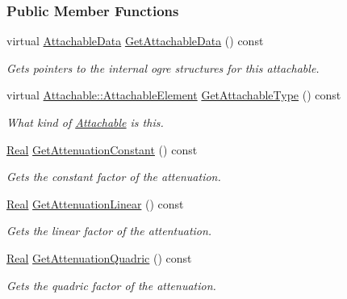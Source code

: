 \subsubsection*{Public Member Functions}
\begin{DoxyCompactItemize}
\item 
virtual \hyperlink{structMezzanine_1_1AttachableData}{AttachableData} \hyperlink{classMezzanine_1_1Light_aefbd732fe2b4a5b00cdb9d30dce2c5ce}{GetAttachableData} () const 
\begin{DoxyCompactList}\small\item\em Gets pointers to the internal ogre structures for this attachable. \item\end{DoxyCompactList}\item 
virtual \hyperlink{classMezzanine_1_1Attachable_a274bd45f9666f6e50f6fdd8a0162bc9e}{Attachable::AttachableElement} \hyperlink{classMezzanine_1_1Light_a530d776b916f3d8164dc2b8583040f64}{GetAttachableType} () const 
\begin{DoxyCompactList}\small\item\em What kind of \hyperlink{classMezzanine_1_1Attachable}{Attachable} is this. \item\end{DoxyCompactList}\item 
\hyperlink{namespaceMezzanine_a726731b1a7df72bf3583e4a97282c6f6}{Real} \hyperlink{classMezzanine_1_1Light_a9564b933f74967b89b144650abe75a48}{GetAttenuationConstant} () const 
\begin{DoxyCompactList}\small\item\em Gets the constant factor of the attenuation. \item\end{DoxyCompactList}\item 
\hyperlink{namespaceMezzanine_a726731b1a7df72bf3583e4a97282c6f6}{Real} \hyperlink{classMezzanine_1_1Light_aeb3f9b4ce95a43fe9253dc455e83f45e}{GetAttenuationLinear} () const 
\begin{DoxyCompactList}\small\item\em Gets the linear factor of the attentuation. \item\end{DoxyCompactList}\item 
\hyperlink{namespaceMezzanine_a726731b1a7df72bf3583e4a97282c6f6}{Real} \hyperlink{classMezzanine_1_1Light_a89f2ed0a02bf28bacad1569877e35a78}{GetAttenuationQuadric} () const 
\begin{DoxyCompactList}\small\item\em Gets the quadric factor of the attenuation. \item\end{DoxyCompactList}\item 

\end{DoxyCompactItemize}
